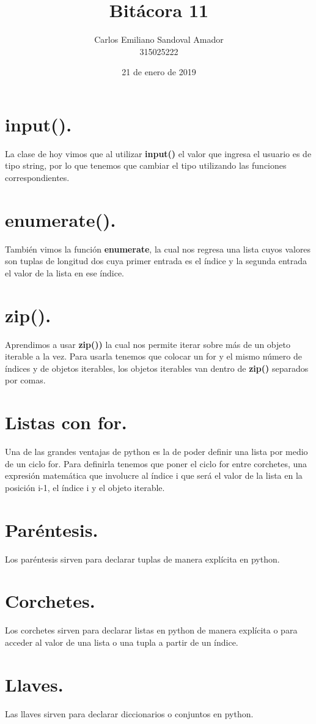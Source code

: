 \documentclass[letterpaper, 12pt, oneside]{article}%
\title{Bitácora 11}
\author{Carlos Emiliano Sandoval Amador \\ 315025222}
\date{21 de enero de 2019}
\begin{document}
	\maketitle
	\section*{input().}
	La clase de hoy vimos que al utilizar \textbf{input()} el valor que ingresa el usuario es de tipo string, por lo que tenemos que cambiar el tipo utilizando las funciones correspondientes. 
	\section*{enumerate().}
	También vimos la función \textbf{enumerate}, la cual nos regresa una lista cuyos valores son tuplas de longitud dos cuya primer entrada es el índice y la segunda entrada el valor de la lista en ese índice.
	\section*{zip().}
	Aprendimos a usar \textbf{zip())} la cual nos permite iterar sobre más de un objeto iterable a la vez. Para usarla tenemos que colocar un for y el mismo número de índices y de objetos iterables, los objetos iterables van dentro de \textbf{zip()} separados por comas.
	\section*{Listas con for.}
	Una de las grandes ventajas de python es la de poder definir una lista por medio de un ciclo for. Para definirla tenemos que poner el ciclo for entre corchetes, una expresión matemática que involucre al índice i que será el valor de la lista en la posición i-1, el índice i y el objeto iterable.
	\section*{Paréntesis.}
	Los paréntesis sirven para declarar tuplas de manera explícita en python.
	\section*{Corchetes.}
	Los corchetes sirven para declarar listas en python de manera explícita o para acceder al valor de una lista o una tupla a partir de un índice.
	\section*{Llaves.}
	Las llaves sirven para declarar diccionarios o conjuntos en python.
\end{document}
